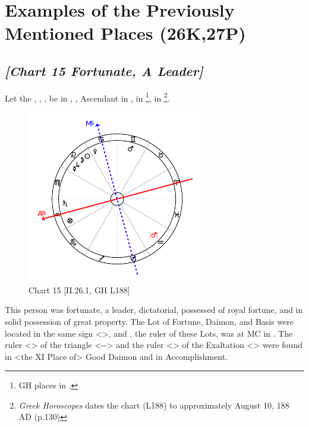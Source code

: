 \section{Examples of the Previously Mentioned Places (26K,27P)}

\subsection*{\textit{[Chart 15 Fortunate, A Leader]}}

Let the \Sun, \Moon, \Jupiter, \Mercury\xspace be in \Leo, \Saturn, Ascendant in \Libra, \Mars\xspace in \Gemini \footnote{GH places \Mars\xspace in \Aquarius.}, \Venus\xspace in \Cancer
\footnote{\textit{Greek Horoscopes} dates the chart (L188) to approximately August 10, 188 AD (p.130)}.

\clearpage
\begin{figure}
\centering
\vspace{-20pt}
\includegraphics[width=0.68\textwidth]{charts/2_26_1}
\caption{Chart 15 [II.26.1, GH L188]}
\label{fig:chart15}
\end{figure}

This person was fortunate, a leader, dictatorial, possessed of royal fortune, and in solid possession of great property. The Lot of Fortune, Daimon, and Basis were located in the same sign <\Libra>, and \Venus, the ruler of these Lots, was at MC in \Cancer. The ruler <\Jupiter> of the triangle <\Leo-\Aries-\Sagittarius> and the ruler <\Mercury> of the Exaltation <\Gemini> were found in <the XI Place of> Good Daimon and in Accomplishment.

